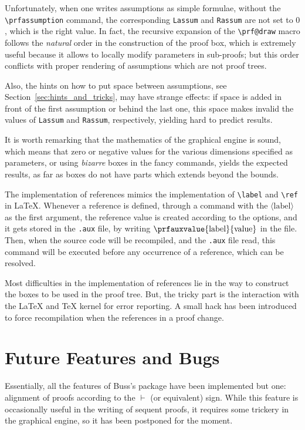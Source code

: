 \documentclass{amsart}
\begin{document}
Unfortunately, when one writes assumptions as simple formulae, without
the \verb|\prfassumption| command, the corresponding \verb|Lassum| and
\verb|Rassum| are not set to $0$, which is the right value. In fact,
the recursive expansion of the \verb|\prf@draw| macro follows the
\emph{natural} order in the construction of the proof box, which is
extremely useful because it allows to locally modify parameters in
sub-proofs; but this order conflicts with proper rendering of
assumptions which are not proof trees.

Also, the hints on how to put space between assumptions, see
Section~\ref{sec:hints_and_tricks}, may have strange effects: if space
is added in front of the first assumption or behind the last one, this
space makes invalid the values of \verb|Lassum| and \verb|Rassum|,
respectively, yielding hard to predict results.

It is worth remarking that the mathematics of the graphical engine is
sound, which means that zero or negative values for the various
dimensions specified as parameters, or using \emph{bizarre} boxes in
the fancy commands, yields the expected results, as far as boxes do
not have parts which extends beyond the bounds.\vspace{2ex}

The implementation of references mimics the implementation of
\verb|\label| and \verb|\ref| in \LaTeX. Whenever a reference is
defined, through a command with the $\langle \mathrm{label}\rangle$ as
the first argument, the reference value is created according to the
options, and it gets stored in the \texttt{.aux} file, by writing
$\verb|\prfauxvalue|\{\mathrm{label}\}\{\mathrm{value}\}$ in the
file. Then, when the source code will be recompiled, and the
\texttt{.aux} file read, this command will be executed before any
occurrence of a reference, which can be resolved.

Most difficulties in the implementation of references lie in the way
to construct the boxes to be used in the proof tree. But, the tricky
part is the interaction with the \LaTeX{} and \TeX{} kernel for error
reporting. A small hack has been introduced to force recompilation
when the references in a proof change.

\clearpage
\section{Future Features and Bugs}\label{sec:future_features}
Essentially, all the features of Buss's package have been implemented
but one: alignment of proofs according to the $\vdash$ (or equivalent)
sign. While this feature is occasionally useful in the writing of
sequent proofs, it requires some trickery in the graphical engine, so
it has been postponed for the moment.\vspace{2ex}
\end{document}
